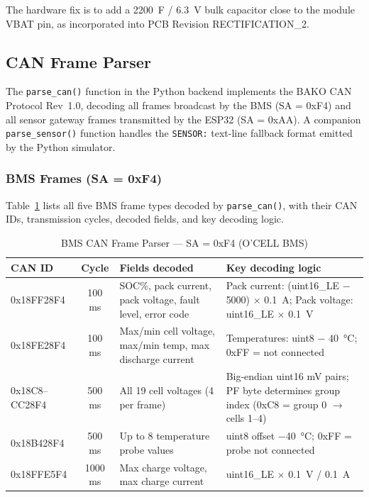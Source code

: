 The hardware fix is to add a 2200~\textmu{}F / 6.3~V bulk capacitor close to the module VBAT pin, as incorporated into PCB Revision RECTIFICATION\_2.

\subsection{CAN Frame Parser}
\label{sec:can-frame-parser}

The \texttt{parse\_can()} function in the Python backend implements the BAKO CAN Protocol Rev~1.0, decoding all frames broadcast by the BMS (SA = 0xF4) and all sensor gateway frames transmitted by the ESP32 (SA = 0xAA). A companion \texttt{parse\_sensor()} function handles the \texttt{SENSOR:} text-line fallback format emitted by the Python simulator.

\subsubsection{BMS Frames (SA = 0xF4)}

Table~\ref{tab:can-parser-bms} lists all five BMS frame types decoded by \texttt{parse\_can()}, with their CAN IDs, transmission cycles, decoded fields, and key decoding logic.

\begin{table}[H]
\centering
\caption{BMS CAN Frame Parser --- SA = 0xF4 (O'CELL BMS)}
\label{tab:can-parser-bms}
\small
\begin{tabular}{>{\ttfamily}p{3.5cm} c p{4.5cm} p{4.0cm}}
\toprule
\textbf{CAN ID} & \textbf{Cycle} & \textbf{Fields decoded} & \textbf{Key decoding logic} \\
\midrule
0x18FF28F4 & 100 ms & SOC\%, pack current, pack voltage, fault level, error code & Pack current: (uint16\_LE $-$ 5000) $\times$ 0.1~A; Pack voltage: uint16\_LE $\times$ 0.1~V \\
\midrule
0x18FE28F4 & 100 ms & Max/min cell voltage, max/min temp, max discharge current & Temperatures: uint8 $-$ 40~°C; 0xFF = not connected \\
\midrule
0x18C8--CC28F4 & 500 ms & All 19 cell voltages (4 per frame) & Big-endian uint16 mV pairs; PF byte determines group index (0xC8 = group 0 $\rightarrow$ cells 1--4) \\
\midrule
0x18B428F4 & 500 ms & Up to 8 temperature probe values & uint8 offset $-$40~°C; 0xFF = probe not connected \\
\midrule
0x18FFE5F4 & 1000 ms & Max charge voltage, max charge current & uint16\_LE $\times$ 0.1~V / 0.1~A \\
\bottomrule
\end{tabular}
\end{table}

